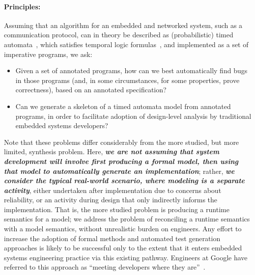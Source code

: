 \paragraph{Principles:} Assuming that an algorithm for an embedded and
networked system, such as a communication protocol, can in theory be
described as (probabilistic) timed automata~\cite{AD1994:TCS}, which
satisfies temporal logic formulas~\cite{BLM2017:LNCS}, and implemented
as a set of imperative programs, we ask:
\begin{itemize}[labelsep=3pt,leftmargin=12pt]
\item Given a set of annotated programs, how can we best automatically
  find bugs in those programs (and, in some circumstances, for some
  properties, prove correctness), based on an annotated
  specification?
\item Can we generate a skeleton of a timed automata model from 
  annotated programs, in order to facilitate adoption of design-level analysis by 
  traditional embedded systems developers? 
\end{itemize}

Note that these problems differ considerably from the more studied,
but more limited, synthesis problem.  Here, \textbf{\itshape we are not assuming that
system development will involve first producing a formal model, then
using that model to automatically generate an implementation}; rather,
\textbf{\itshape we consider the typical real-world scenario, where modeling is a
separate activity}, either undertaken after implementation due to
concerns about reliability, or an activity during design that only
indirectly informs the implementation.  That is, the more studied
problem is producing a runtime semantics for a model; we address the
problem of reconciling a runtime semantics with a model semantics,
without unrealistic burden on engineers.   Any
effort to increase the
adoption of formal methods and automated test generation
approaches is likely to be successful only to the extent that it enters
embedded systems engineering practice via this existing pathway.  Engineers at Google have referred to this
approach as ``meeting developers where they are''~\cite{meeting}.



